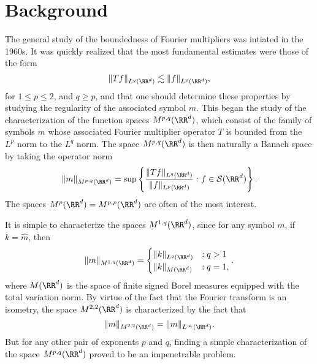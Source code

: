 \chapter{Background}

The general study of the boundedness of Fourier multipliers was intiated in the 1960s. It was quickly realized that the most fundamental estimates were those of the form
%
\[ \| Tf \|_{L^q(\RR^d)} \lesssim \| f \|_{L^p(\RR^d)}, \]
%
for $1 \leq p \leq 2$, and $q \geq p$, and that one should determine these properties by studying the regularity of the associated symbol $m$. This began the study of the characterization of the function spaces $M^{p,q}(\RR^d)$, which consist of the family of symbols $m$ whose associated Fourier multiplier operator $T$ is bounded from the $L^p$ norm to the $L^q$ norm. The space $M^{p,q}(\RR^d)$ is then naturally a Banach space by taking the operator norm
%
\[ \| m \|_{M^{p,q}(\RR^d)} = \sup \left\{ \frac{\| T f \|_{L^q(\RR^d)}}{\| f \|_{L^p(\RR^d)}} : f \in \mathcal{S}(\RR^d) \right\}. \]
%
The spaces $M^p(\RR^d) = M^{p,p}(\RR^d)$ are often of the most interest.

It is simple to characterize the spaces $M^{1,q}(\RR^d)$, since for any symbol $m$, if $k = \widehat{m}$, then
%
\[ \| m \|_{M^{1,q}(\RR^d)} = \begin{cases} \| k \|_{L^q(\RR^d)} &: q > 1 \\ \| k \|_{M(\RR^d)} &: q = 1, \end{cases}. \]
%
where $M(\RR^d)$ is the space of finite signed Borel measures equipped with the total variation norm. By virtue of the fact that the Fourier transform is an isometry, the space $M^{2,2}(\RR^d)$ is characterized by the fact that
%
\[ \| m \|_{M^{2,2}(\RR^d)} = \| m \|_{L^\infty(\RR^d)}. \]
%
But for any other pair of exponents $p$ and $q$, finding a simple characterization of the space $M^{p,q}(\RR^d)$ proved to be an impenetrable problem.

